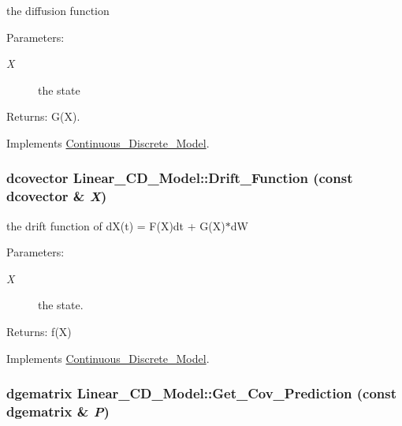 the diffusion function 

\begin{Desc}
\item[Parameters:]
\begin{description}
\item[{\em X}]the state\end{description}
\end{Desc}
\begin{Desc}
\item[Returns:]G(X). \end{Desc}


Implements \hyperlink{class_continuous___discrete___model_e305ba43f31be1275ede8d3d48d1d779}{Continuous\_\-Discrete\_\-Model}.\hypertarget{class_linear___c_d___model_4a35ab32a6ff01885368d1b3690f4925}{
\subsubsection[{Drift\_\-Function}]{\setlength{\rightskip}{0pt plus 5cm}dcovector Linear\_\-CD\_\-Model::Drift\_\-Function (const dcovector \& {\em X})}}
\label{class_linear___c_d___model_4a35ab32a6ff01885368d1b3690f4925}


the drift function of dX(t) = F(X)dt + G(X)$\ast$dW 

\begin{Desc}
\item[Parameters:]
\begin{description}
\item[{\em X}]the state.\end{description}
\end{Desc}
\begin{Desc}
\item[Returns:]f(X) \end{Desc}


Implements \hyperlink{class_continuous___discrete___model_fb901d0d92470ee3e2f5a06f74336b7d}{Continuous\_\-Discrete\_\-Model}.\hypertarget{class_linear___c_d___model_8dd88775ae8db03490c423bbfb108440}{
\subsubsection[{Get\_\-Cov\_\-Prediction}]{\setlength{\rightskip}{0pt plus 5cm}dgematrix Linear\_\-CD\_\-Model::Get\_\-Cov\_\-Prediction (const dgematrix \& {\em P})}}
\label{class_linear___c_d___model_8dd88775ae8db03490c423bbfb108440}


